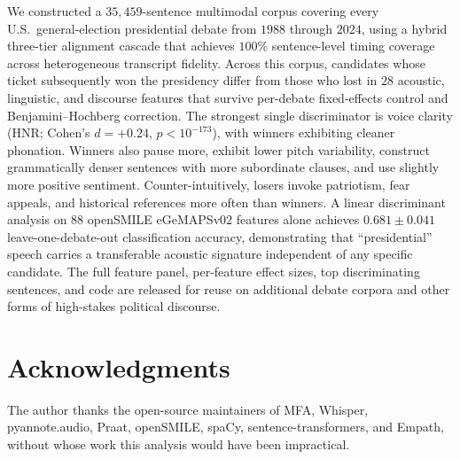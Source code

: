 \documentclass[journal]{IEEEtran}
\begin{document}
We constructed a $35{,}459$-sentence multimodal corpus covering every
U.S.\ general-election presidential debate from $1988$ through $2024$,
using a hybrid three-tier alignment cascade that achieves $100\%$
sentence-level timing coverage across heterogeneous transcript
fidelity. Across this corpus, candidates whose ticket subsequently
won the presidency differ from those who lost in $28$ acoustic,
linguistic, and discourse features that survive per-debate
fixed-effects control and Benjamini--Hochberg correction. The
strongest single discriminator is voice clarity (HNR; Cohen's
$d = +0.24$, $p < 10^{-173}$), with winners exhibiting cleaner
phonation. Winners also pause more, exhibit lower pitch variability,
construct grammatically denser sentences with more subordinate
clauses, and use slightly more positive sentiment. Counter-intuitively,
losers invoke patriotism, fear appeals, and historical references
more often than winners. A linear discriminant analysis on $88$
openSMILE eGeMAPSv02 features alone achieves $0.681 \pm 0.041$
leave-one-debate-out classification accuracy, demonstrating that
``presidential'' speech carries a transferable acoustic signature
independent of any specific candidate. The full feature panel,
per-feature effect sizes, top discriminating sentences, and code are
released for reuse on additional debate corpora and other forms of
high-stakes political discourse.

\section*{Acknowledgments}
The author thanks the open-source maintainers of MFA, Whisper,
pyannote.audio, Praat, openSMILE, spaCy, sentence-transformers, and
Empath, without whose work this analysis would have been impractical.



\end{document}
